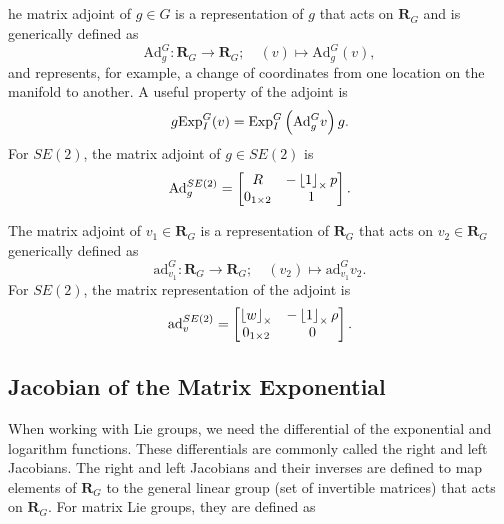 \subsection{}
he matrix adjoint of $g\in G$ is a representation of $g$ that acts on $\mathbf{R}_G$ and is generically defined as 
\[
\text{Ad}^G_{g}:\mathbf{R}_G\to\mathbf{R}_G;\quad\left(v\right)\mapsto \text{Ad}^{G}_{g}(v),
\]
and represents, for example, a change of coordinates from one location on the manifold to another.
A useful property of the adjoint is 
\begin{equation}\label{eq:lie_groups_review_adjoint_relation}
g\Exp_I^{G}(v)=\Exp_I^{G}\left(\text{Ad}^G_g v\right)g.    
\end{equation}
%
For $SE(2)$, the matrix adjoint of $g \in SE(2)$ is
%
\begin{equation}
    \text{Ad}^{SE(2)}_g = \begin{bmatrix}
    R & -\ss{1} p\\
    0_{1\times 2} &1
    \end{bmatrix}.
\end{equation}

The matrix adjoint of $v_1 \in \mathbf{R}_G$ is a representation of $\mathbf{R}_G$ that acts on $v_2 \in \mathbf{R}_G$ generically defined as 
\begin{equation*}
\text{ad}^G_{v_1}:\mathbf{R}_G\to \mathbf{R}_G; \quad \left( v_2\right)\mapsto \text{ad}^G_{v_1}v_2.
\end{equation*}
%
For $SE(2)$, the matrix representation of the adjoint is
\begin{equation*}
\text{ad}^{SE(2)}_{v} = \begin{bmatrix}
\ss{w} & -\ss{1}\rho \\
0_{1\times 2} & 0
\end{bmatrix}.
\end{equation*}

\subsection{Jacobian of the Matrix Exponential}

When working with Lie groups, we need the differential of the exponential
and logarithm functions. These differentials are commonly called
the right and left Jacobians. The right and left Jacobians and their inverses are defined to map elements of $\mathbf{R}_G$ to the general linear group (set of invertible matrices) that acts on $\mathbf{R}_G$. For matrix Lie groups, they are defined as

